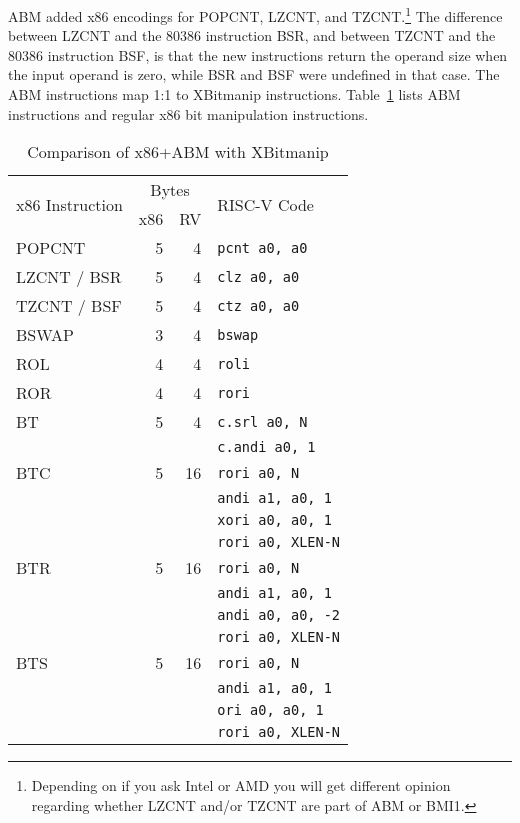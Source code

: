 ABM added x86 encodings for POPCNT, LZCNT, and TZCNT.\footnote{Depending on if
you ask Intel or AMD you will get different opinion regarding whether LZCNT
and/or TZCNT are part of ABM or BMI1.} The difference between LZCNT and the
80386 instruction BSR, and between TZCNT and the 80386 instruction BSF, is that
the new instructions return the operand size when the input operand is zero,
while BSR and BSF were undefined in that case. The ABM instructions map 1:1 to
XBitmanip instructions. Table~\ref{abm-comp} lists ABM instructions and regular
x86 bit manipulation instructions.

\begin{table}[h]
\centering
\begin{tabular}{lrrl}
\multirow{2}{*}{x86 Instruction} & \multicolumn{2}{c}{Bytes} & \multirow{2}{*}{RISC-V Code} \\
& x86 & RV & \\
\hline
POPCNT       &   5 &  4 & {\tt pcnt a0, a0} \\
\hline
LZCNT / BSR  &   5 &  4 & {\tt clz a0, a0} \\
\hline
TZCNT / BSF  &   5 &  4 & {\tt ctz a0, a0} \\
\hline
BSWAP        &   3 &  4 & {\tt bswap} \\
\hline
ROL          &   4 &  4 & {\tt roli} \\
\hline
ROR          &   4 &  4 & {\tt rori} \\
\hline
BT           &   5 &  4 & {\tt c.srl a0, N} \\
             &     &    & {\tt c.andi a0, 1} \\
\hline
BTC          &   5 & 16 & {\tt rori a0, N} \\
             &     &    & {\tt andi a1, a0, 1} \\
             &     &    & {\tt xori a0, a0, 1} \\
             &     &    & {\tt rori a0, XLEN-N} \\
\hline
BTR          &   5 & 16 & {\tt rori a0, N} \\
             &     &    & {\tt andi a1, a0, 1} \\
             &     &    & {\tt andi a0, a0, -2} \\
             &     &    & {\tt rori a0, XLEN-N} \\
\hline
BTS          &   5 & 16 & {\tt rori a0, N} \\
             &     &    & {\tt andi a1, a0, 1} \\
             &     &    & {\tt ori a0, a0, 1} \\
             &     &    & {\tt rori a0, XLEN-N} \\
\end{tabular}
\caption{Comparison of x86+ABM with XBitmanip}
\label{abm-comp}
\end{table}

